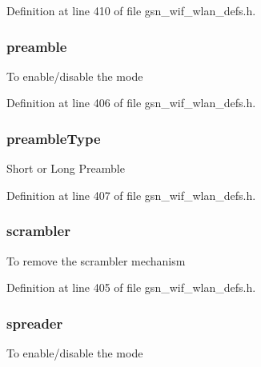 Definition at line 410 of file gsn\_\-wif\_\-wlan\_\-defs.h.

\hypertarget{a00189_a4e1f59dc2cd10b195a57cab357e42ff6}{
\subsubsection[{preamble}]{ {\bf preamble}}}
\label{a00189_a4e1f59dc2cd10b195a57cab357e42ff6}
To enable/disable the mode 

Definition at line 406 of file gsn\_\-wif\_\-wlan\_\-defs.h.

\hypertarget{a00189_a1af7a22bf7a18ef09da23ae8d0e08d22}{
\subsubsection[{preambleType}]{ {\bf preambleType}}}
\label{a00189_a1af7a22bf7a18ef09da23ae8d0e08d22}
Short or Long Preamble 

Definition at line 407 of file gsn\_\-wif\_\-wlan\_\-defs.h.

\hypertarget{a00189_a808943286ddbb9bc1773a11a1f2c7cb3}{
\subsubsection[{scrambler}]{ {\bf scrambler}}}
\label{a00189_a808943286ddbb9bc1773a11a1f2c7cb3}
To remove the scrambler mechanism 

Definition at line 405 of file gsn\_\-wif\_\-wlan\_\-defs.h.

\hypertarget{a00189_a143ba26831a37e201c67c2ccb165bf56}{
\subsubsection[{spreader}]{ {\bf spreader}}}
\label{a00189_a143ba26831a37e201c67c2ccb165bf56}
To enable/disable the mode 

